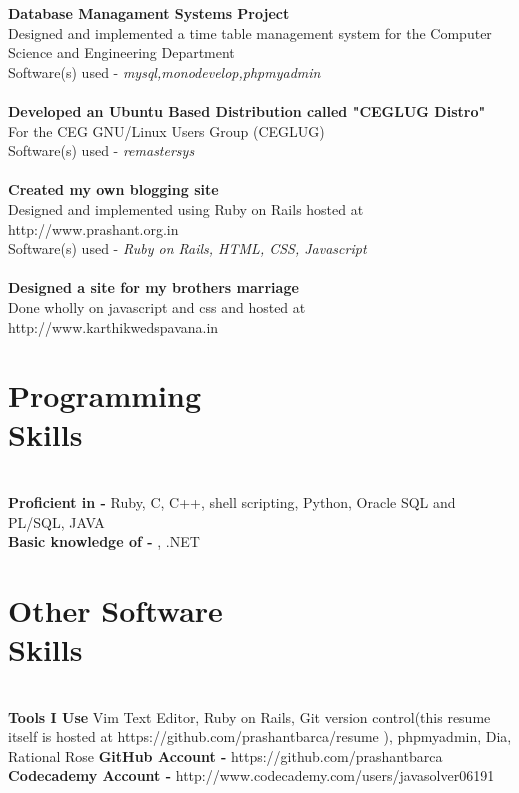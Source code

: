 \documentclass[margin,line]{resume}
\begin{document}
\begin{resume}
    \textbf{Database Managament Systems Project} \\Designed and implemented a time table management system for the Computer Science and Engineering Department \vspace{2mm}\\\vspace{1mm}%
    Software(s) used -  \textsl{mysql,monodevelop,phpmyadmin}\\
    \\\textbf{Developed an Ubuntu Based Distribution called "CEGLUG Distro"} \\For the CEG GNU/Linux Users Group (CEGLUG) \vspace{2mm}\\\vspace{1mm}%
    Software(s) used -  \textsl{remastersys}\\
    \\\textbf{Created my own blogging site} \\Designed and implemented using Ruby on Rails hosted at http://www.prashant.org.in \vspace{2mm}\\\vspace{1mm}%
    Software(s) used -  \textsl{Ruby on Rails, HTML, CSS, Javascript}\\
    \\\textbf{Designed a site for my brothers marriage} \\Done wholly on javascript and css and hosted at http://www.karthikwedspavana.in  \vspace{2mm}\\\vspace{1mm}%

    \section{\mysidestyle Programming\\Skills}\\ 
    \textbf{Proficient in -}  Ruby, C, C++, shell scripting, Python, Oracle SQL and PL/SQL, JAVA
\\\textbf{Basic knowledge of -}  \LaTeXe, .NET 

    \section{\mysidestyle Other Software\\Skills} \\
    \textbf{Tools I Use}  Vim Text Editor, Ruby on Rails, Git version control(this resume itself is hosted at https://github.com/prashantbarca/resume ), phpmyadmin, Dia, Rational Rose
    \textbf{GitHub Account -}  https://github.com/prashantbarca
    \\\textbf{Codecademy Account -}  http://www.codecademy.com/users/javasolver06191

\end{resume}
\end{document}
